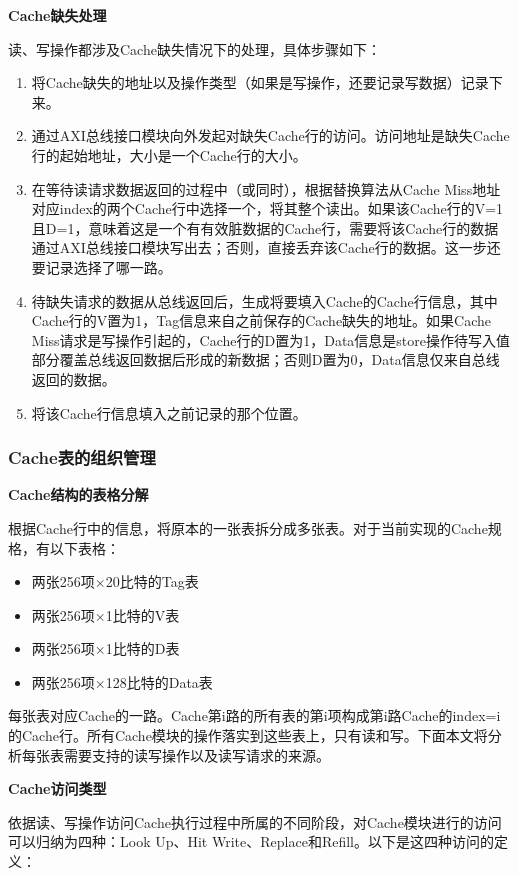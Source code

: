 \textbf{Cache缺失处理}

读、写操作都涉及Cache缺失情况下的处理，具体步骤如下：

\begin{enumerate}
\def\labelenumi{\arabic{enumi}.}
\tightlist
\item
  将Cache缺失的地址以及操作类型（如果是写操作，还要记录写数据）记录下来。
\item
  通过AXI总线接口模块向外发起对缺失Cache行的访问。访问地址是缺失Cache行的起始地址，大小是一个Cache行的大小。
\item
  在等待读请求数据返回的过程中（或同时），根据替换算法从Cache Miss地址对应index的两个Cache行中选择一个，将其整个读出。如果该Cache行的V=1且D=1，意味着这是一个有有效脏数据的Cache行，需要将该Cache行的数据通过AXI总线接口模块写出去；否则，直接丢弃该Cache行的数据。这一步还要记录选择了哪一路。
\item
  待缺失请求的数据从总线返回后，生成将要填入Cache的Cache行信息，其中Cache行的V置为1，Tag信息来自之前保存的Cache缺失的地址。如果Cache Miss请求是写操作引起的，Cache行的D置为1，Data信息是store操作待写入值部分覆盖总线返回数据后形成的新数据；否则D置为0，Data信息仅来自总线返回的数据。
\item
  将该Cache行信息填入之前记录的那个位置。
\end{enumerate}

\subsubsection{Cache表的组织管理}\label{sec:09-cache-010}

\textbf{Cache结构的表格分解}

根据Cache行中的信息，将原本的一张表拆分成多张表。对于当前实现的Cache规格，有以下表格：

\begin{itemize}
\item 两张256项×20比特的Tag表
\item 两张256项×1比特的V表
\item 两张256项×1比特的D表
\item 两张256项×128比特的Data表
\end{itemize}


每张表对应Cache的一路。Cache第i路的所有表的第i项构成第i路Cache的index=i的Cache行。所有Cache模块的操作落实到这些表上，只有读和写。下面本文将分析每张表需要支持的读写操作以及读写请求的来源。

\textbf{Cache访问类型}

依据读、写操作访问Cache执行过程中所属的不同阶段，对Cache模块进行的访问可以归纳为四种：Look Up、Hit Write、Replace和Refill。以下是这四种访问的定义：

